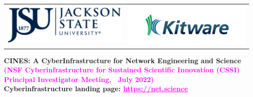 \documentclass[landscape,paperwidth=70in,paperheight=46in,fontscale=0.225]{baposter} %
\begin{document}
\begin{poster}
{\begin{tabular}{c c}
\includegraphics[scale=0.4]{logos/jsu.png} &
\includegraphics[scale=0.4]{logos/kitware.png} \\
\end{tabular}
}
{\textbf{CINES: A CyberInfrastructure for Network Engineering and Science} \\
\vspace{-3mm}
{
           \textcolor{magenta}{%
               {\textbf{\Large{(NSF Cyberinfrastructure for Sustained Scientific Innovation (CSSI) Principal Investigator Meeting,~ July 2022)}}}} \\
               \vspace{2.5mm}
                 \textbf{\Large{Cyberinfrastructure landing page:  \textcolor{magenta}{\underline{https://net.science}}}}            
            } }%
            

\end{poster}
\end{document}
